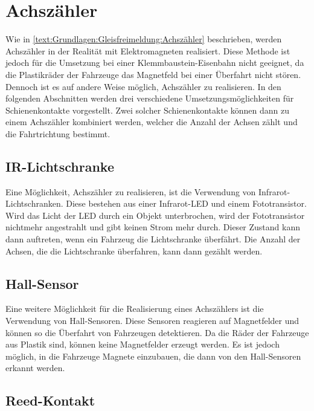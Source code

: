 \section{Achszähler}\label{text:Methodik:Achszähler}

Wie in \autoref{text:Grundlagen:Gleisfreimeldung:Achszähler} beschrieben, werden Achszähler in der Realität mit Elektromagneten realisiert. Diese Methode ist jedoch für die Umsetzung bei einer Klemmbaustein-Eisenbahn nicht geeignet, da die Plastikräder der Fahrzeuge das Magnetfeld bei einer Überfahrt nicht stören. Dennoch ist es auf andere Weise möglich, Achszähler zu realisieren.
\newline
In den folgenden Abschnitten werden drei verschiedene Umsetzungsmöglichkeiten für Schienenkontakte vorgestellt. Zwei solcher Schienenkontakte können dann zu einem Achszähler kombiniert werden, welcher die Anzahl der Achsen zählt und die Fahrtrichtung bestimmt.

\subsection{IR-Lichtschranke}\label{text:Methodik:Achszähler:Lichtschranke}

Eine Möglichkeit, Achszähler zu realisieren, ist die Verwendung von Infrarot-Lichtschranken. Diese bestehen aus einer Infrarot-LED und einem Fototransistor. Wird das Licht der LED durch ein Objekt unterbrochen, wird der Fototransistor nichtmehr angestrahlt und gibt keinen Strom mehr durch. Dieser Zustand kann dann auftreten, wenn ein Fahrzeug die Lichtschranke überfährt. Die Anzahl der Achsen, die die Lichtschranke überfahren, kann dann gezählt werden. 

\subsection{Hall-Sensor}\label{text:Methodik:Achszähler:Hall-Sensor}

Eine weitere Möglichkeit für die Realisierung eines Achszählers ist die Verwendung von Hall-Sensoren. Diese Sensoren reagieren auf Magnetfelder und können so die Überfahrt von Fahrzeugen detektieren. Da die Räder der Fahrzeuge aus Plastik sind, können keine Magnetfelder erzeugt werden. Es ist jedoch möglich, in die Fahrzeuge Magnete einzubauen, die dann von den Hall-Sensoren erkannt werden. 

\subsection{Reed-Kontakt}\label{text:Methodik:Achszähler:Reed-Kontakt}

